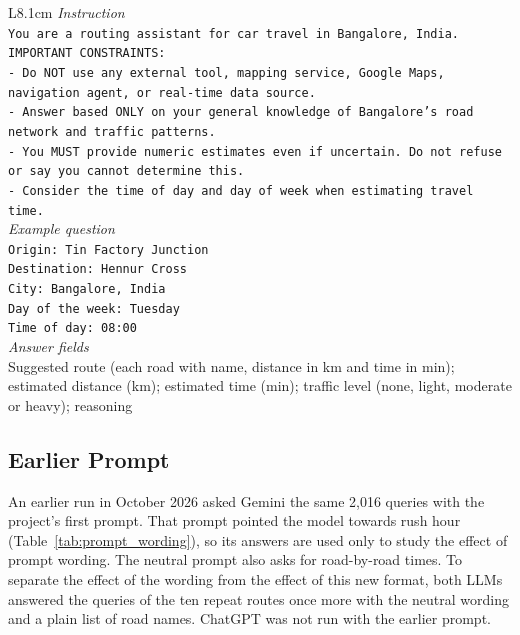 \documentclass[conference]{IEEEtran}
\begin{document}
\begin{table}[!htb]
\caption{Neutral Prompt and Answer Format for Both LLMs}
\label{tab:prompt}
\centering
\footnotesize
\begin{tabular}{L{8.1cm}}
\hline
\textit{Instruction} \\
\texttt{You are a routing assistant for car travel in Bangalore, India.} \\
\texttt{IMPORTANT CONSTRAINTS:} \\
\texttt{- Do NOT use any external tool, mapping service, Google Maps, navigation agent, or real-time data source.} \\
\texttt{- Answer based ONLY on your general knowledge of Bangalore's road network and traffic patterns.} \\
\texttt{- You MUST provide numeric estimates even if uncertain. Do not refuse or say you cannot determine this.} \\
\texttt{- Consider the time of day and day of week when estimating travel time.} \\
\hline
\textit{Example question} \\
\texttt{Origin: Tin Factory Junction} \\
\texttt{Destination: Hennur Cross} \\
\texttt{City: Bangalore, India} \\
\texttt{Day of the week: Tuesday} \\
\texttt{Time of day: 08:00} \\
\hline
\textit{Answer fields} \\
Suggested route (each road with name, distance in km and time in min); estimated distance (km); estimated time (min); traffic level (none, light, moderate or heavy); reasoning \\
\hline
\end{tabular}
\end{table}

\subsection{Earlier Prompt}
An earlier run in October 2026 asked Gemini the same 2,016 queries with the project's first prompt. That prompt pointed the model towards rush hour (Table~\ref{tab:prompt_wording}), so its answers are used only to study the effect of prompt wording. The neutral prompt also asks for road-by-road times. To separate the effect of the wording from the effect of this new format, both LLMs answered the queries of the ten repeat routes once more with the neutral wording and a plain list of road names. ChatGPT was not run with the earlier prompt.
\end{document}
